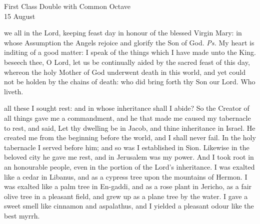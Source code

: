 \begin{inhead}
    {First Class Double with Common Octave\\
15 August}
\end{inhead}
\par\noindent
{}


\introit
{} we all in the Lord, keeping feast day in honour of the blessed Virgin Mary: in whose Assumption the Angels rejoice and glorify the Son of God. \textit{Ps.} My heart is inditing of a good matter: I speak of the things which I have made unto the King.
\collect
{} beseech thee, O Lord, let us be continually aided by the sacred feast of this day, whereon the holy Mother of God underwent death in this world, and yet could not be holden by the chains of death: who did bring forth thy Son our Lord. Who liveth.

 all these I sought rest: and in whose inheritance shall I abide? So the Creator of all things gave me a commandment, and he that made me caused my tabernacle to rest, and said, Let thy dwelling be in Jacob, and thine inheritance in Israel. He created me from the beginning before the world, and I shall never fail. In the holy tabernacle I served before him; and so was I established in Sion. Likewise in the beloved city he gave me rest, and in Jerusalem was my power. And I took root in an honourable people, even in the portion of the Lord's inheritance. I was exalted like a cedar in Libanus, and as a cypress tree upon the mountains of Hermon. I was exalted like a palm tree in En-gaddi, and as a rose plant in Jericho, as a fair olive tree in a pleasant field, and grew up as a plane tree by the water. I gave a sweet smell like cinnamon and aspalathus, and I yielded a pleasant odour like the best myrrh.

